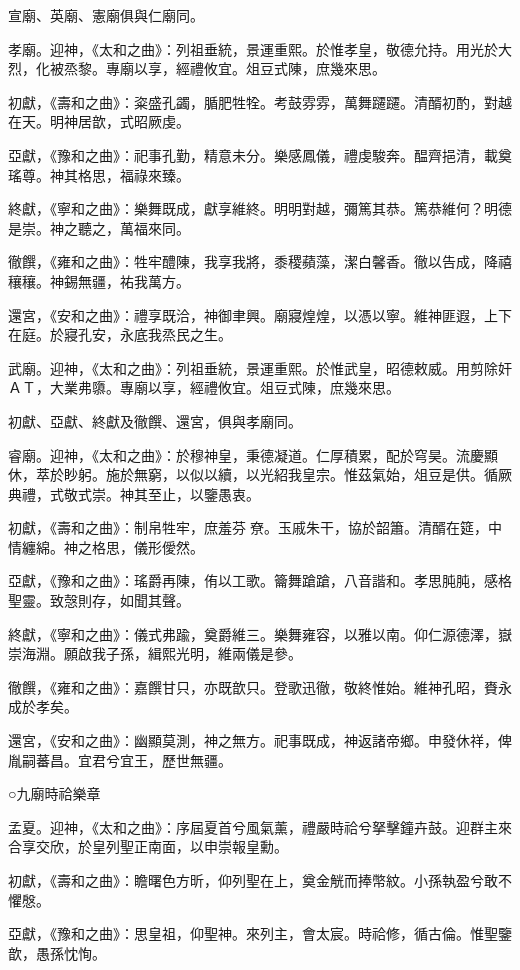 宣廟、英廟、憲廟俱與仁廟同。

孝廟。迎神，《太和之曲》：列祖垂統，景運重熙。於惟孝皇，敬德允持。用光於大烈，化被烝黎。專廟以享，經禮攸宜。俎豆式陳，庶幾來思。

初獻，《壽和之曲》：粢盛孔蠲，腯肥牲牷。考鼓雰雰，萬舞躚躚。清醑初酌，對越在天。明神居歆，式昭厥虔。

亞獻，《豫和之曲》：祀事孔勤，精意未分。樂感鳳儀，禮虔駿奔。醖齊挹清，載奠瑤尊。神其格思，福祿來臻。

終獻，《寧和之曲》：樂舞既成，獻享維終。明明對越，彌篤其恭。篤恭維何？明德是崇。神之聽之，萬福來同。

徹饌，《雍和之曲》：牲牢醴陳，我享我將，黍稷蘋藻，潔白馨香。徹以告成，降禧穰穰。神錫無疆，祐我萬方。

還宮，《安和之曲》：禮享既洽，神御聿興。廟寢煌煌，以憑以寧。維神匪遐，上下在庭。於寢孔安，永底我烝民之生。

武廟。迎神，《太和之曲》：列祖垂統，景運重熙。於惟武皇，昭德敕威。用剪除奸ＡＴ，大業弗隳。專廟以享，經禮攸宜。俎豆式陳，庶幾來思。

初獻、亞獻、終獻及徹饌、還宮，俱與孝廟同。

睿廟。迎神，《太和之曲》：於穆神皇，秉德凝道。仁厚積累，配於穹昊。流慶顯休，萃於眇躬。施於無窮，以似以續，以光紹我皇宗。惟茲氣始，俎豆是供。循厥典禮，式敬式崇。神其至止，以鑒愚衷。

初獻，《壽和之曲》：制帛牲牢，庶羞芬尞。玉戚朱干，協於韶簫。清醑在筵，中情纏綿。神之格思，儀形僾然。

亞獻，《豫和之曲》：瑤爵再陳，侑以工歌。籥舞蹌蹌，八音諧和。孝思肫肫，感格聖靈。致愨則存，如聞其聲。

終獻，《寧和之曲》：儀式弗踰，奠爵維三。樂舞雍容，以雅以南。仰仁源德澤，嶽崇海淵。願啟我子孫，緝熙光明，維兩儀是參。

徹饌，《雍和之曲》：嘉饌甘只，亦既歆只。登歌迅徹，敬終惟始。維神孔昭，賚永成於孝矣。

還宮，《安和之曲》：幽顯莫測，神之無方。祀事既成，神返諸帝鄉。申發休祥，俾胤嗣蕃昌。宜君兮宜王，歷世無疆。

○九廟時祫樂章

孟夏。迎神，《太和之曲》：序屆夏首兮風氣薰，禮嚴時祫兮拏擊鐘卉鼓。迎群主來合享交欣，於皇列聖正南面，以申崇報皇勳。

初獻，《壽和之曲》：瞻曙色方昕，仰列聖在上，奠金觥而捧幣紋。小孫執盈兮敢不懼慇。

亞獻，《豫和之曲》：思皇祖，仰聖神。來列主，會太宸。時祫修，循古倫。惟聖鑒歆，愚孫忱恂。

